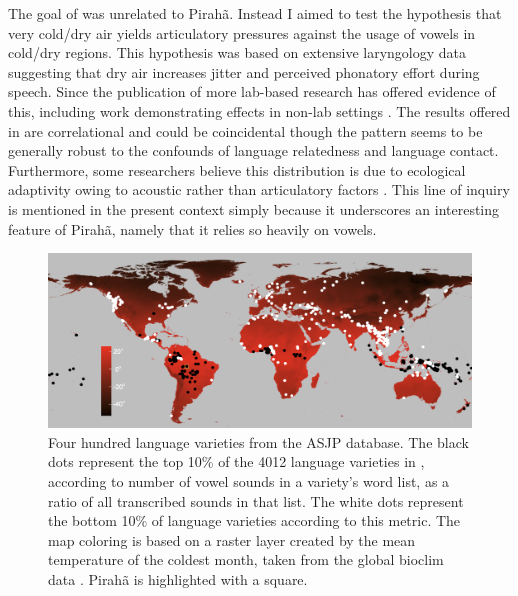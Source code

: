 \documentclass[output=paper,colorlinks,citecolor=brown
]{langscibook}
\begin{document}
    The goal of  was unrelated to Pirahã. Instead I aimed to test the hypothesis that very cold/dry air yields articulatory pressures against the usage of vowels in cold/dry regions. This hypothesis was based on extensive laryngology data suggesting that dry air increases jitter and perceived phonatory effort during speech. Since the publication of  more lab-based research has offered evidence of this, including work demonstrating effects in non-lab settings \citep{alves2019effect}. The results offered in  are correlational and could be coincidental though the pattern seems to be generally robust to the confounds of language relatedness and language contact. Furthermore, some researchers believe this distribution is due to ecological adaptivity owing to acoustic rather than articulatory factors \citep{maddieson2018language}. This line of inquiry is mentioned in the present context simply because it underscores an interesting feature of Pirahã, namely that it relies so heavily on vowels.


\begin{figure}
\centering
\includegraphics[width=1\textwidth]{figures/everett_figure4.png}
\caption{\label{fig:Figure 4}Four hundred language varieties from the ASJP database. The black dots represent the top 10\% of the 4012 language varieties in , according to number of vowel sounds in a variety’s word list, as a ratio of all transcribed sounds in that list. The white dots represent the bottom 10\% of language varieties according to this metric. The map coloring is based on a raster layer created by the mean temperature of the coldest month, taken from the global bioclim data \citep{noce2020new}. Pirahã is highlighted with a square.}

\end{figure}
\end{document}
